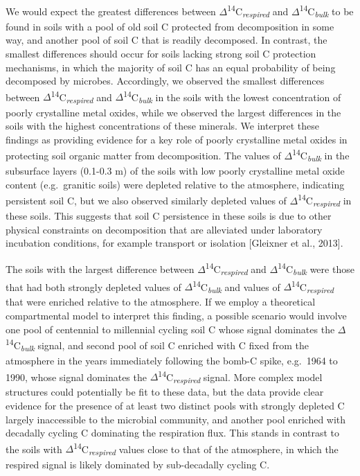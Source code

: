 \documentclass[english,man,floatsintext]{apa6}
\begin{document}
We would expect the greatest differences between \(\Delta\)\textsuperscript{14}C\textsubscript{\emph{respired}} and \(\Delta\)\textsuperscript{14}C\textsubscript{\emph{bulk}} to be found in soils with a pool of old soil C protected from decomposition in some way, and another pool of soil C that is readily decomposed. In contrast, the smallest differences should occur for soils lacking strong soil C protection mechanisms, in which the majority of soil C has an equal probability of being decomposed by microbes. Accordingly, we observed the smallest differences between \(\Delta\)\textsuperscript{14}C\textsubscript{\emph{respired}} and \(\Delta\)\textsuperscript{14}C\textsubscript{\emph{bulk}} in the soils with the lowest concentration of poorly crystalline metal oxides, while we observed the largest differences in the soils with the highest concentrations of these minerals. We interpret these findings as providing evidence for a key role of poorly crystalline metal oxides in protecting soil organic matter from decomposition. The values of \(\Delta\)\textsuperscript{14}C\textsubscript{\emph{bulk}} in the subsurface layers (0.1-0.3 m) of the soils with low poorly crystalline metal oxide content (e.g.~granitic soils) were depleted relative to the atmosphere, indicating persistent soil C, but we also observed similarly depleted values of \(\Delta\)\textsuperscript{14}C\textsubscript{\emph{respired}} in these soils. This suggests that soil C persistence in these soils is due to other physical constraints on decomposition that are alleviated under laboratory incubation conditions, for example transport or isolation {[}Gleixner et al., 2013{]}.

The soils with the largest difference between \(\Delta\)\textsuperscript{14}C\textsubscript{\emph{respired}} and \(\Delta\)\textsuperscript{14}C\textsubscript{\emph{bulk}} were those that had both strongly depleted values of \(\Delta\)\textsuperscript{14}C\textsubscript{\emph{bulk}} and values of \(\Delta\)\textsuperscript{14}C\textsubscript{\emph{respired}} that were enriched relative to the atmosphere. If we employ a theoretical compartmental model to interpret this finding, a possible scenario would involve one pool of centennial to millennial cycling soil C whose signal dominates the \(\Delta\)\textsuperscript{14}C\textsubscript{\emph{bulk}} signal, and second pool of soil C enriched with C fixed from the atmosphere in the years immediately following the bomb-C spike, e.g.~1964 to 1990, whose signal dominates the \(\Delta\)\textsuperscript{14}C\textsubscript{\emph{respired}} signal. More complex model structures could potentially be fit to these data, but the data provide clear evidence for the presence of at least two distinct pools with strongly depleted C largely inaccessible to the microbial community, and another pool enriched with decadally cycling C dominating the respiration flux. This stands in contrast to the soils with \(\Delta\)\textsuperscript{14}C\textsubscript{\emph{respired}} values close to that of the atmosphere, in which the respired signal is likely dominated by sub-decadally cycling C.
\end{document}
